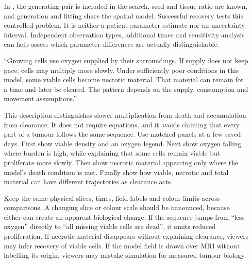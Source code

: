 In , the generating pair is included in the search, seed and tissue ratio are known, and generation and fitting share the spatial model. Successful recovery tests this controlled problem. It is neither a patient parameter estimate nor an uncertainty interval. Independent observation types, additional times and sensitivity analysis can help assess which parameter differences are actually distinguishable.

\biomedicalanswer
{}
``Growing cells use oxygen supplied by their surroundings. If supply does not keep pace, cells may multiply more slowly. Under sufficiently poor conditions in this model, some viable cells become necrotic material. That material can remain for a time and later be cleared. The pattern depends on the supply, consumption and movement assumptions.''

This description distinguishes slower multiplication from death and accumulation from clearance. It does not require equations, and it avoids claiming that every part of a tumour follows the same sequence.
Use matched panels at a few saved days. First show viable density and an oxygen legend. Next show oxygen falling where burden is high, while explaining that some cells remain viable but proliferate more slowly. Then show necrotic material appearing only where the model's death condition is met. Finally show how viable, necrotic and total material can have different trajectories as clearance acts.

Keep the same physical slices, times, field labels and colour limits across comparisons. A changing slice or colour scale should be announced, because either can create an apparent biological change.
If the sequence jumps from ``less oxygen'' directly to ``all missing viable cells are dead'', it omits reduced proliferation. If necrotic material disappears without explaining clearance, viewers may infer recovery of viable cells. If the model field is drawn over MRI without labelling its origin, viewers may mistake simulation for measured tumour biology.

